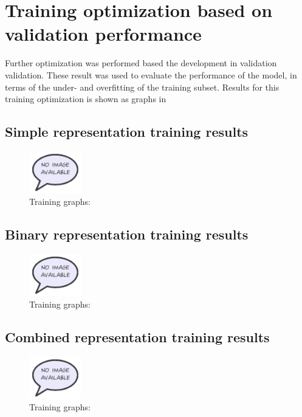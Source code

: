 \section{Training optimization based on validation performance}
Further optimization was performed based the development in validation validation. These result was used to evaluate the performance of the model, in terms of the under- and overfitting of the training subset. Results for this training optimization is shown as graphs in %

\subsection{Simple representation training results}
\begin{figure} [H]
\centering
\includegraphics[width=0.2\textwidth]{figures/missimage}
\caption{Training graphs: }
\label{fig:simpleGraph}  
\end{figure}

\subsection{Binary representation training results}
\begin{figure} [H]
\centering
\includegraphics[width=0.2\textwidth]{figures/missimage}
\caption{Training graphs:}
\label{fig:binaryGraph}  
\end{figure}

\subsection{Combined representation training results}
\begin{figure} [H]
\centering
\includegraphics[width=0.2\textwidth]{figures/missimage}
\caption{Training graphs:}
\label{fig:combinedGraph}  
\end{figure}



